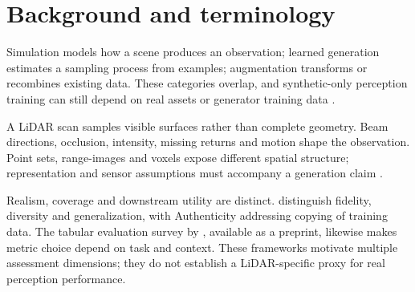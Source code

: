 \section{Background and terminology}
\label{sec:background}
Simulation models how a scene produces an observation; learned generation
estimates a sampling process from examples; \gls{augmentation} transforms
or recombines existing data. These categories overlap, and synthetic-only
perception training can still depend on real assets or generator training
data \parencite{nikolenkoSyntheticDataDeep2019,manivasagamLiDARsimRealisticLiDAR2020a}.

A LiDAR scan samples visible surfaces rather than complete geometry.
Beam directions, \gls{occlusion}, \gls{intensity}, missing returns and
motion shape the observation. Point sets, \glspl{range-image} and
\glspl{voxel} expose different spatial structure; representation and
sensor assumptions must accompany a generation claim
\parencite{zyrianovLearningGenerateRealistic2022,manivasagamZeroDomainGap2023}.

Realism, coverage and downstream \gls{utility} are distinct.
\Textcite{alaaHowFaithfulYour2022} distinguish fidelity, diversity and
generalization, with Authenticity addressing copying of training data.
The tabular evaluation survey by \textcite{achterbergMetricsThatMatter2026},
available as a preprint, likewise makes metric choice depend on task and
context. These frameworks motivate multiple assessment dimensions; they do
not establish a LiDAR-specific proxy for real perception performance.
